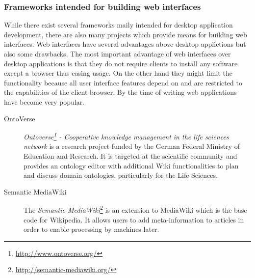 \subsubsection{Frameworks intended for building web interfaces}
While there exist several frameworks maily intended
for desktop application development, there are also many projects which
provide means for building web interfaces.
Web interfaces have several advantages above desktop applictions but also some drawbacks.
The most important advantage of web interfaces over desktop applications
is that they do not require clients to install any software except a browser
thus easing usage. On the other hand they might limit the
functionality because all user interface features depend on and are
restricted to the capabilities of the client browser.
By the time of writing web applications have become very popular.
\begin{description}
        \item[OntoVerse] 
                        \emph{Ontoverse\footnote{\url{http://www.ontoverse.org/}}
                - Cooperative knowledge management in the life sciences network}
                is a research project funded by the German Federal Ministry of 
                Education and Research. It is targeted at the scientific community and provides an
                ontology editor with additional Wiki functionalities to plan and
                discuss domain ontologies, particularly for the Life Sciences.
        \item[Semantic MediaWiki]
                        The \emph{Semantic MediaWiki}\footnote{\url{http://semantic-mediawiki.org/}}
                is an extension to MediaWiki which is the base code for Wikipedia.
                It allows users to add meta-information to articles
                in order to enable processing by machines later.
\end{description}

